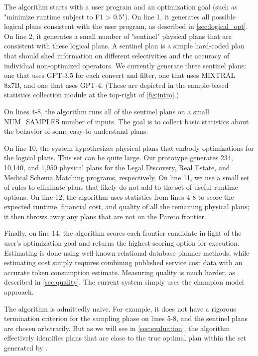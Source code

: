 The algorithm starts with a user program and an optimization goal (such as "minimize runtime subject to F1 > 0.5").  On line 1, it generates all possible logical plans consistent with the user program, as described in \autoref{sec:logical_opt}.  On line 2, it generates a small number of "sentinel" physical plans that are consistent with these logical plans. A sentinel plan is a simple hard-coded plan that should shed information on different selectivities and the accuracy of individual non-optimized operators. We currently generate three sentinel plans: one that uses GPT-3.5 for each convert and filter, one that uses MIXTRAL 8x7B, and one that uses GPT-4. (These are depicted in the sample-based statistics collection module at the top-right of \autoref{fig:intro}.)

On lines 4-8, the algorithm runs all of the sentinel plans on a small NUM\_SAMPLES number of inputs. The goal is to collect basic statistics about the behavior of some easy-to-understand plans.

On line 10, the system hypothesizes physical plans that embody optimizations for the logical plans.  This set can be quite large.  Our prototype generates 234, 10,140, and 1,950 physical plans for the Legal Discovery, Real Estate, and Medical Schema Matching programs, respectively.  On line 11, we use a small set of rules to eliminate plans that likely do not add to the set of useful runtime options.  On line 12, the algorithm uses statistics from lines 4-8 to score the expected runtime, financial cost, and quality of all the remaining physical plans; it then throws away any plans that are not on the Pareto frontier.

Finally, on line 14, the algorithm scores each frontier candidate in light of the user's optimization goal and returns the highest-scoring option for execution.  Estimating is done using well-known relational database planner methods, while estimating cost simply requires combining published service cost data with an accurate token consumption estimate.  Measuring quality is much harder, as described in \autoref{sec:quality}. The current system simply uses the champion model approach.

The algorithm is admittedly naive. For example, it does not have a rigorous termination criterion for the sampling phase on lines 5-8, and the sentinel plans are chosen arbitrarily. But as we will see in \autoref{sec:evaluation}, the algorithm effectively identifies plans that are close to the true optimal plan within the set generated by \system{}.

